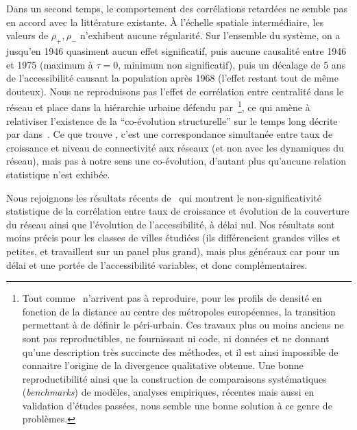 Dans un second temps, le comportement des corrélations retardées ne semble pas en accord avec la littérature existante. À l'échelle spatiale intermédiaire, les valeurs de $\rho_+,\rho_-$ n'exhibent aucune régularité. Sur l'ensemble du système, on a jusqu'en 1946 quasiment aucun effet significatif, puis aucune causalité entre 1946 et 1975 (maximum à $\tau = 0$, minimum non significatif), puis un décalage de 5 ans de l'accessibilité causant la population après 1968 (l'effet restant tout de même douteux). Nous ne reproduisons pas l'effet de corrélation entre centralité dans le réseau et place dans la hiérarchie urbaine défendu par~\cite{bretagnolle2003vitesse}\footnote{Tout comme~\cite{lemoy2017scaling} n'arrivent pas à reproduire, pour les profils de densité en fonction de la distance au centre des métropoles européennes, la transition permettant à \cite{guerois2008built} de définir le péri-urbain. Ces travaux plus ou moins anciens ne sont pas reproductibles, ne fournissant ni code, ni données et ne donnant qu'une description très succincte des méthodes, et il est ainsi impossible de connaitre l'origine de la divergence qualitative obtenue. Une bonne reproductibilité ainsi que la construction de comparaisons systématiques (\emph{benchmarks}) de modèles, analyses empiriques, récentes mais aussi en validation d'études passées, nous semble une bonne solution à ce genre de problèmes.}, ce qui amène à relativiser l'existence de la ``co-évolution structurelle'' sur le temps long décrite par  dans~\cite{espacegeo2014effets}. Ce que trouve \cite{bretagnolle2003vitesse}, c'est une correspondance simultanée entre taux de croissance et niveau de connectivité aux réseaux (et non avec les dynamiques du réseau), mais pas à notre sens une co-évolution, d'autant plus qu'aucune relation statistique n'est exhibée.


Nous rejoignons les résultats récents de~\cite{mimeur:hal-01616746} qui montrent le non-significativité statistique de la corrélation entre taux de croissance et évolution de la couverture du réseau ainsi que l'évolution de l'accessibilité, à délai nul. Nos résultats sont moins précis pour les classes de villes étudiées (ils différencient grandes villes et petites, et travaillent sur un panel plus grand), mais plus généraux car pour un délai et une portée de l'accessibilité variables, et donc complémentaires.



